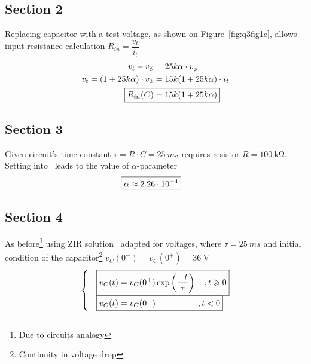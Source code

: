 \documentclass[11pt,a4paper,titlepage]{article}
\makeatletter
\let\reftagform@=\tagform@
\def\tagform@#1{\maketag@@@{(\ignorespaces\textcolor{red}{#1}\unskip\@@italiccorr)}}
\renewcommand{\eqref}[1]{\textup{\reftagform@{\ref{#1}}}}
\makeatother
\begin{document}
{\subsection{Section 2}{
Replacing capacitor with a test voltage, as shown on Figure~\ref{fig:q3fig1c}, allows input resistance calculation $R_{in}=\dfrac{v_t}{i_t}$
\begin{align}
v_t-v_{\phi}&=25k\alpha \cdot v_{\phi} \nonumber \\
v_t=(1+25k\alpha) \cdot v_{\phi}&=15k(1+25k\alpha) \cdot i_t \nonumber \\
\Aboxed{R_{in}(C)&=15k(1+25k\alpha) \label{eq:10}}
\end{align}
}
\subsection{Section 3}{Given circuit's time constant $\tau=R \cdot C=25~\si{ms}$ requires resistor $R=100~\si{\kohm}$. Setting into~\eqref{eq:10} leads to the value of $\alpha$-parameter
\begin{align*}
\Aboxed{\alpha \approx 2.26 \cdot 10^{-4}}
\end{align*}
}
\subsection{Section 4}{As before\footnote{Due to circuits analogy} using ZIR solution~\eqref{eq:7} adapted for voltages, where $\tau=25~\si{ms}$ and initial condition of the capacitor\footnote{Continuity in voltage drop} $v_C(0^-)=v_C(0^+)=36~\si{\volt}$
\begin{align*}
\begin{cases}
\Aboxed{v_C(t)&=v_C(0^+)\exp\left({\dfrac{-t}{\tau}}\right) \quad, t\geqslant0} \\
\Aboxed{v_C(t)&=v_C(0^-) \hspace{5.1em}, t<0} \\
\end{cases}
\end{align*}
}
}\label{sec:q3sec}
\end{document}
